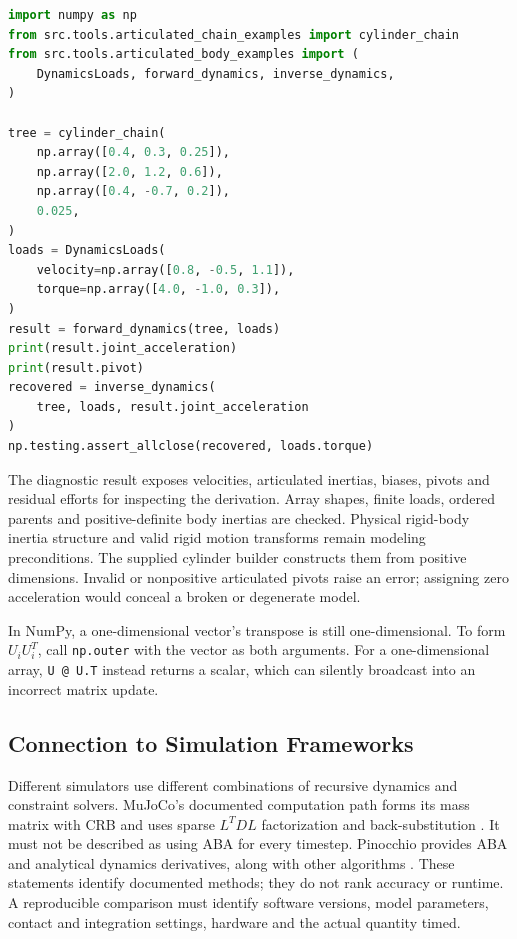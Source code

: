 \begin{lstlisting}[language=Python,basicstyle=\ttfamily\small]
import numpy as np
from src.tools.articulated_chain_examples import cylinder_chain
from src.tools.articulated_body_examples import (
    DynamicsLoads, forward_dynamics, inverse_dynamics,
)

tree = cylinder_chain(
    np.array([0.4, 0.3, 0.25]),
    np.array([2.0, 1.2, 0.6]),
    np.array([0.4, -0.7, 0.2]),
    0.025,
)
loads = DynamicsLoads(
    velocity=np.array([0.8, -0.5, 1.1]),
    torque=np.array([4.0, -1.0, 0.3]),
)
result = forward_dynamics(tree, loads)
print(result.joint_acceleration)
print(result.pivot)
recovered = inverse_dynamics(
    tree, loads, result.joint_acceleration
)
np.testing.assert_allclose(recovered, loads.torque)
\end{lstlisting}

The diagnostic result exposes velocities, articulated inertias, biases, pivots and residual efforts for inspecting the derivation. Array shapes, finite loads, ordered parents and positive-definite body inertias are checked. Physical rigid-body inertia structure and valid rigid motion transforms remain modeling preconditions. The supplied cylinder builder constructs them from positive dimensions. Invalid or nonpositive articulated pivots raise an error; assigning zero acceleration would conceal a broken or degenerate model.

In NumPy, a one-dimensional vector's transpose is still one-dimensional. To form $U_iU_i^T$, call \texttt{np.outer} with the vector as both arguments. For a one-dimensional array, \texttt{U @ U.T} instead returns a scalar, which can silently broadcast into an incorrect matrix update.

\subsection{Connection to Simulation Frameworks}
\label{subsec:simulation_frameworks}

Different simulators use different combinations of recursive dynamics and constraint solvers. MuJoCo's documented computation path forms its mass matrix with CRB and uses sparse $L^TDL$ factorization and back-substitution \cite{MuJoCoComputationReview}. It must not be described as using ABA for every timestep. Pinocchio provides ABA and analytical dynamics derivatives, along with other algorithms \cite{PinocchioSoftwareReview}. These statements identify documented methods; they do not rank accuracy or runtime. A reproducible comparison must identify software versions, model parameters, contact and integration settings, hardware and the actual quantity timed.

